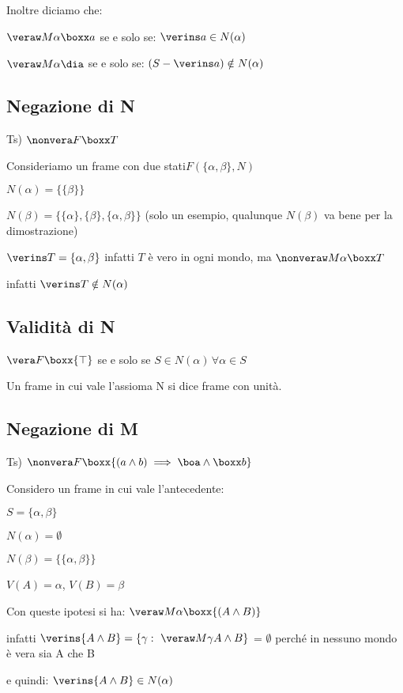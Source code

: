 Inoltre diciamo che:

$\veraw M{\alpha}{\boxx a}$ se e solo se: $\verins a\in N(\alpha)$	

$\veraw M{\alpha}{\dia}$ se e solo se: $(S-\verins a)\notin N(\alpha)$	


\subsection{Negazione di N}

Ts) $\nonvera F{\boxx T}$

Consideriamo un frame con due stati$F(\{\alpha,\beta\},N)$

$N(\alpha)=\{\{\beta\}\}$

$N(\beta)=\{\{\alpha\},\{\beta\},\{\alpha,\beta\}\}$ (solo un esempio,
qualunque $N(\beta)$ va bene per la dimostrazione)

$\verins T=\{\alpha,\beta\}$ infatti $T$ è vero in ogni mondo, ma
$\nonveraw M{\alpha}{\boxx T}$ 

infatti $\verins T\notin N(\alpha)$


\subsection{Validità di N}

$\vera F{\boxx{\top}}$ se e solo se $S\in N(\alpha)\,\forall\alpha\in S$

Un frame in cui vale l'assioma N si dice frame con unità.


\subsection{Negazione di M}

Ts) $\nonvera F{\boxx{(a\wedge b)\implies\boa\wedge\boxx b}}$

Considero un frame in cui vale l'antecedente:

$S=\{\alpha,\beta\}$

$N(\alpha)=\emptyset$

$N(\beta)=\{\{\alpha,\beta\}\}$

$V(A)=\alpha$, $V(B)=\beta$

Con queste ipotesi si ha: $\veraw M{\alpha}{\boxx{(A\wedge B)}}$

infatti $\verins{A\wedge B}=\{\gamma:\ \mbox{\ensuremath{\veraw M{\gamma}{A\wedge B}}\}}$
= $\emptyset$ perché in nessuno mondo è vera sia A che B

e quindi:	$\verins{A\wedge B}\in N(\alpha)$ 

